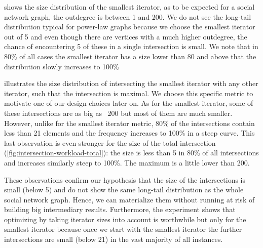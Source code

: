 
 shows the size distribution of the smallest iterator, as to be expected for a social network
graph, the outdegree is between 1 and 200.
We do not see the long-tail distribution typical for power-law graphs because we choose the smallest iterator out of 5 and even
though there are vertices with a much higher outdegree, the chance of encountering 5 of these in a single intersection is small.
We note that in 80\% of all cases the smallest iterator has a size lower than 80 and above that the distribution slowly increases to 100\%

 illustrates the size distribution of intersecting the smallest iterator with any other
iterator, such that the intersection is maximal.
We choose this specific metric to motivate one of our design choices later on.
As for the smallest iterator, some of these intersections are as big as ~200 but most of them are much smaller.
However, unlike for the smallest iterator metric, 80\% of the intersections contain less than 21  elements and the frequency increases to
100\% in a steep curve.
This last observation is even stronger for the size of the total intersection (\cref{fig:intersection-workload-total}):
the size is less than 5 in 80\% of all intersections and increases similarly steep to 100\%.
The maximum is a little lower than 200.

These observations confirm our hypothesis that the size of the intersections is small (below 5) and do not show the same long-tail
distribution as the whole social network graph.
Hence, we can materialize them without running at risk of building big intermediary results.
Furthermore, the experiment shows that optimizing by taking iterator sizes into account is worthwhile but only for the smallest iterator
because
once we start with the smallest iterator the further intersections are small (below 21) in the vast majority of all instances.


